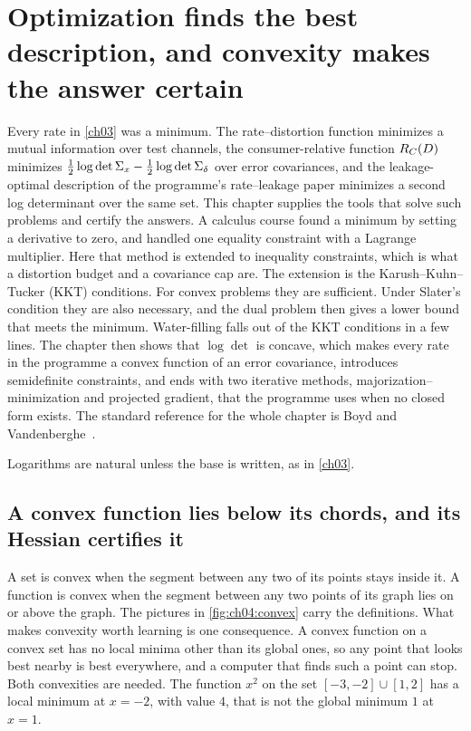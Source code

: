 \chapter{Optimization finds the best description, and convexity makes the answer certain}\label{ch04}

Every rate in \cref{ch03} was a minimum. The rate--distortion function minimizes a mutual information over test channels, the consumer-relative function $R_C(D)$ minimizes $\frac12\log\det\Sigma_x-\frac12\log\det\Sigma_\delta$ over error covariances, and the leakage-optimal description of the programme's rate--leakage paper minimizes a second log determinant over the same set. This chapter supplies the tools that solve such problems and certify the answers. A calculus course found a minimum by setting a derivative to zero, and handled one equality constraint with a Lagrange multiplier. Here that method is extended to inequality constraints, which is what a distortion budget and a covariance cap are. The extension is the Karush--Kuhn--Tucker (KKT) conditions. For convex problems they are sufficient. Under Slater's condition they are also necessary, and the dual problem then gives a lower bound that meets the minimum. Water-filling falls out of the KKT conditions in a few lines. The chapter then shows that $\log\det$ is concave, which makes every rate in the programme a convex function of an error covariance, introduces semidefinite constraints, and ends with two iterative methods, majorization--minimization and projected gradient, that the programme uses when no closed form exists. The standard reference for the whole chapter is Boyd and Vandenberghe~\cite{boydvandenberghe2004}.

Logarithms are natural unless the base is written, as in \cref{ch03}.

\section{A convex function lies below its chords, and its Hessian certifies it}\label{sec:ch04:convex}

A set is convex when the segment between any two of its points stays inside it. A function is convex when the segment between any two points of its graph lies on or above the graph. The pictures in \cref{fig:ch04:convex} carry the definitions. What makes convexity worth learning is one consequence. A convex function on a convex set has no local minima other than its global ones, so any point that looks best nearby is best everywhere, and a computer that finds such a point can stop. Both convexities are needed. The function $x^2$ on the set $[-3,-2]\cup[1,2]$ has a local minimum at $x=-2$, with value $4$, that is not the global minimum $1$ at $x=1$.

